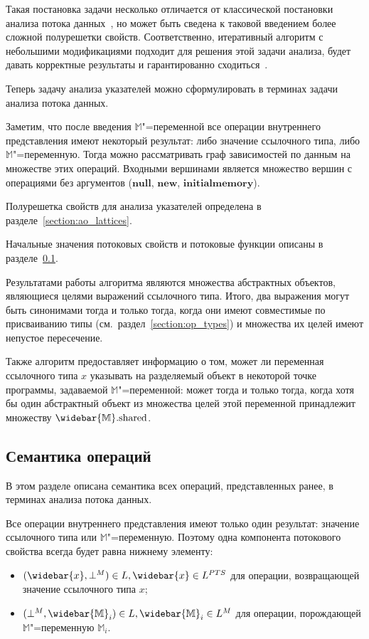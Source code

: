 \documentclass[14pt,titlepage,draft]{extarticle}
\newcommand{\M}{\ensuremath{\mathbb{M}}}
\newcommand{\Ms}{\ensuremath{\mathbb{\widebar{M}}}}
\newcommand{\Mf}[1]{\ensuremath{\mathrm{#1}}}
\newcommand{\op}[1]{\mathbf{#1}}
\newcommand{\pts}[1]{\widebar{#1}}
\begin{document}
    Такая постановка задачи несколько отличается от классической постановки
    анализа потока данных~\cite{muchnick, nielson}, но может быть сведена к
    таковой введением более сложной полурешетки свойств.
    Соответственно, итеративный алгоритм с небольшими модификациями подходит
    для решения этой задачи анализа, будет давать корректные результаты и
    гарантированно сходиться~\cite{kildall}.

    Теперь задачу анализа указателей можно сформулировать в терминах задачи
    анализа потока данных.

    Заметим, что после введения \M"=переменной все операции внутреннего
    представления имеют некоторый результат: либо значение ссылочного типа,
    либо \M"=переменную. Тогда можно рассматривать граф зависимостей по данным
    на множестве этих операций. Входными вершинами является множество вершин с
    операциями без аргументов
    ($\op{null}$, $\op{new}$, $\op{initialmemory}$).

    Полурешетка свойств для анализа указателей определена в
    разделе~\ref{section:ao_lattices}.

    Начальные значения потоковых свойств и потоковые функции описаны
    в разделе~\ref{section:flow_functions}.

    Результатами работы алгоритма являются множества абстрактных объектов,
    являющиеся целями выражений ссылочного типа. Итого, два выражения могут быть
    синонимами тогда и только тогда, когда они имеют совместимые по
    присваиванию типы (см.~раздел~\ref{section:op_types}) и множества их целей
    имеют непустое пересечение.

    Также алгоритм предоставляет информацию о том, может ли переменная
    ссылочного типа $x$ указывать на разделяемый объект в некоторой точке
    программы, задаваемой \M"=переменной: может тогда и только тогда, когда
    хотя бы один абстрактный объект из множества целей этой переменной
    принадлежит множеству $\Ms.\Mf{shared}$.

  \subsection{Семантика операций}
    \label{section:flow_functions}

    В этом разделе описана семантика всех операций, представленных ранее, в
    терминах анализа потока данных.

    Все операции внутреннего представления имеют только один результат:
    значение ссылочного типа или \M"=переменную. Поэтому одна компонента
    потокового свойства всегда будет равна нижнему элементу:
    \begin{itemize}
      \item $(\pts{x}, \bot^M) \in L, \pts{x} \in L^{PTS}$ для операции,
            возвращающей значение ссылочного типа $x$;
      \item $(\bot^M, \Ms_i) \in L, \Ms_i \in L^M$ для операции, порождающей
            \M"=переменную $\M_i$.
    \end{itemize}
\end{document}
